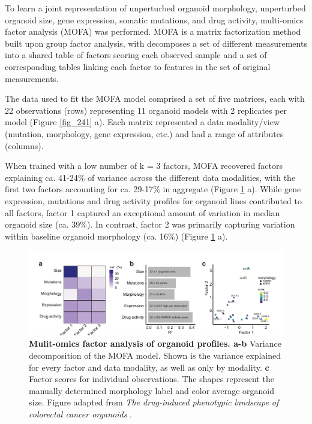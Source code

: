 \begin{flushleft}
\bigbreak
To learn a joint representation of unperturbed organoid morphology, unperturbed organoid size, gene expression, somatic mutations, and drug activity, multi-omics factor analysis (MOFA) was performed. MOFA is a matrix factorization method built upon group factor analysis, with decomposes a set of different measurements into a shared table of factors scoring each observed sample and a set of corresponding tables linking each factor to features in the set of original measurements. 

\bigbreak
The data used to fit the MOFA model comprised a set of five matrices, each with 22 observations (rows) representing 11 organoid models with 2 replicates per model (Figure \ref{fig_241} a). Each matrix represented a data modality/view (mutation, morphology, gene expression, etc.) and had a range of attributes (columns).


\bigbreak
When trained with a low number of k = 3 factors, MOFA recovered factors explaining ca. 41-24\% of variance across the different data modalities, with the first two factors accounting for ca. 29-17\% in aggregate (Figure \ref{fig_240} a). While gene expression, mutations and drug activity profiles for organoid lines contributed to all factors, factor 1 captured an exceptional amount of variation in median organoid size (ca. 39\%). In contrast, factor 2 was primarily capturing variation within baseline organoid morphology (ca. 16\%) (Figure \ref{fig_240} a).

\begin{figure}[h!]
\centering
\includegraphics[width=\textwidth,
                height=\textheight,
                keepaspectratio]{figures/promise/pdf/fig_4_0.pdf}
\caption{\textbf{Mulit-omics factor analysis of organoid profiles. a-b} Variance decomposition of the MOFA model. Shown is the variance explained for every factor and data modality, as well as only by modality. \textbf{c} Factor scores for individual observations. The shapes represent the manually determined morphology label and color average organoid size. Figure adapted from \textit{The drug-induced phenotypic landscape of colorectal cancer organoids} \cite{Betge2022-kr}.}
\label{fig_240}
\end{figure}


\end{flushleft}
